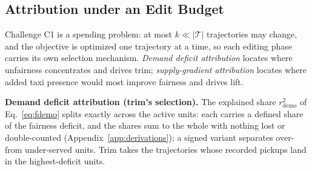 \subsection{Attribution under an Edit Budget}\label{sec:editor}

\label{sec:attribution}%
Challenge C1 is a spending problem: at most $k \ll |\mathcal{T}|$
trajectories may change, and the objective is optimized one trajectory at a
time, so each editing phase carries its own selection mechanism.
\emph{Demand deficit attribution} locates where unfairness concentrates and
drives trim; \emph{supply-gradient attribution} locates where added taxi
presence would most improve fairness and drives lift.

\textbf{Demand deficit attribution (trim's selection).} The explained share
$r^{2}_{\mathrm{demo}}$ of Eq.~\eqref{eq:fdemo} splits exactly across the
active units: each carries a defined share of the
fairness deficit, and the shares sum to the whole with nothing lost or
double-counted (Appendix~\ref{app:derivations}); a signed variant
separates over- from under-served units. Trim takes the trajectories whose
recorded pickups land in the highest-deficit units.


